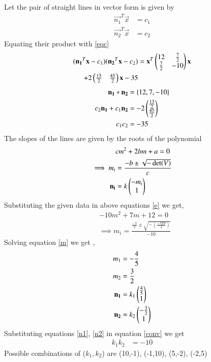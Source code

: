 \documentclass[journal,12pt,twocolumn]{IEEEtran}
\begin{document}
Let the pair of straight lines in vector form is given by
\begin{align}
    \vec{n_1}^T\vec{x}&=c_1\label{m1}\\
    \vec{n_2}^T\vec{x}&=c_2\label{m2}
\end{align}
Equating their product with \eqref{eqc}
\begin{align}
(\mathbf{n_1}^T\mathbf{x}-c_1)(\mathbf{n_2}^T\mathbf{x}-c_2) &=\mathbf{x}^T\begin{pmatrix}12 & \frac{7}{2} \\\frac{7}{2} & -10\end{pmatrix}\mathbf{x}\notag\\
+2\begin{pmatrix}\frac{13}{2} & \frac{45}{2}\end{pmatrix}\mathbf{x}-35\label{equate}
\end{align}
\begin{align}
    \mathbf{n_1}*\mathbf{n_2}&=\{12,7,-10\}\label{conv}\\
    c_2\mathbf{n_1}+c_1\mathbf{n_2}&=-2\begin{pmatrix}\frac{13}{2}\\\frac{45}{2}\end{pmatrix}\label{eqc1c2}\\
    c_1c_2&=-35
\end{align}
The slopes of the lines are given by the roots of the polynomial 
\begin{align}
    &cm^2+2bm+a=0\label{e}\\
    \implies m_i&=\frac{-b\pm{\sqrt{-\det(V)}}}{c}\\
    \mathbf{n_i}&=k\begin{pmatrix}-m_i\\1\end{pmatrix}
\end{align}
Substituting the given data in above equations \eqref{e} we get,
\begin{align}
    &-10m^2+7m+12=0\\
    &\implies m_i=\frac{\frac{-7}{2}\pm{\sqrt{-(\frac{-529}{4})}}}{-10}\label{m}
\end{align}
Solving equation \eqref{m} we get ,
\begin{align}
    m_1&=-\frac{4}{5}\\
    m_2&=\frac{3}{2}\\
    \mathbf{n_1}&=k_1\begin{pmatrix}\frac{4}{5}\\1\end{pmatrix}\label{n1}\\
    \mathbf{n_2}&=k_2\begin{pmatrix}-\frac{3}{2} \\1\end{pmatrix}\label{n2}
\end{align}
Substituting equations \eqref{n1}, \eqref{n2} in equation \eqref{conv} we get 
\begin{align}
    k_1k_2&=-10
\end{align}
Possible combinations of ($k_1,k_2$) are (10,-1), (-1,10), (5,-2), (-2,5)
\end{document}
